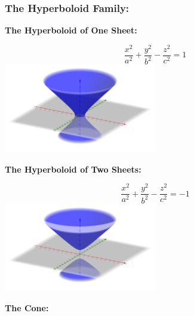 \documentclass[14pt]{article}
\begin{document}
    \subsubsection{The Hyperboloid Family:}
    \textbf{The Hyperboloid of One Sheet:}
    \begin{multicols}{2}
        \begin{equation}\frac{x^2}{a^2}+\frac{y^2}{b^2}-\frac{z^2}{c^2}=1\end{equation}
        \includegraphics[width=0.5\textwidth]{Hyperboloid1.png}
    \end{multicols}
    
    \textbf{The Hyperboloid of Two Sheets:}
    \begin{multicols}{2}
        \begin{equation}\frac{x^2}{a^2}+\frac{y^2}{b^2}-\frac{z^2}{c^2}=-1\end{equation}
        \includegraphics[width=0.5\textwidth]{Hyperboloid2.png}
    \end{multicols}
    
    \textbf{The Cone:}
    
\end{document}
